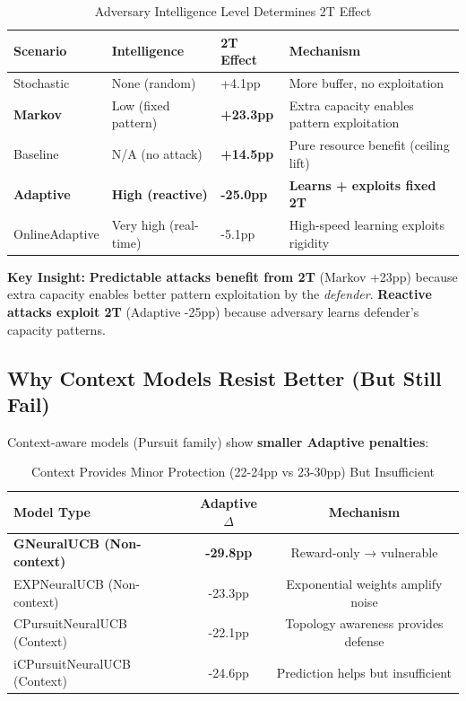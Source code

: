 \documentclass[11pt,a4paper]{article}
\newcommand{\critical}[1]{\textcolor{criticalcolor}{\textbf{#1}}}
\newcommand{\success}[1]{\textcolor{successcolor}{\textbf{#1}}}
\begin{document}
\vspace{-0.4cm}
\begin{table}[h]
\scriptsize
\centering
\begin{tabular}{llll}
\toprule
\textbf{Scenario} & \textbf{Intelligence} & \textbf{2T Effect} & \textbf{Mechanism} \\
\midrule
Stochastic & None (random) & +4.1pp & More buffer, no exploitation \\
\success{Markov} & Low (fixed pattern) & \success{+23.3pp} & Extra capacity enables pattern exploitation \\
Baseline & N/A (no attack) & \success{+14.5pp} & Pure resource benefit (ceiling lift) \\
\critical{Adaptive} & \critical{High (reactive)} & \critical{-25.0pp} & \critical{Learns + exploits fixed 2T} \\
OnlineAdaptive & Very high (real-time) & -5.1pp & High-speed learning exploits rigidity \\
\bottomrule
\end{tabular}
\vspace{-0.2cm}
\caption{Adversary Intelligence Level Determines 2T Effect}
\end{table}

\vspace{-0.2cm}
\textbf{Key Insight:} \success{Predictable attacks benefit from 2T} (Markov +23pp) because extra capacity enables better pattern exploitation by the \textit{defender}. \critical{Reactive attacks exploit 2T} (Adaptive -25pp) because adversary learns defender's capacity patterns.

\subsection{Why Context Models Resist Better (But Still Fail)}

Context-aware models (Pursuit family) show \textbf{smaller Adaptive penalties}:

\vspace{-0.4cm}
\begin{table}[h]
\scriptsize
\centering
\begin{tabular}{lcc}
\toprule
\textbf{Model Type} & \textbf{Adaptive $\Delta$} & \textbf{Mechanism} \\
\midrule
\critical{GNeuralUCB (Non-context)} & \critical{-29.8pp} & Reward-only → vulnerable \\
EXPNeuralUCB (Non-context) & -23.3pp & Exponential weights amplify noise \\
CPursuitNeuralUCB (Context) & -22.1pp & Topology awareness provides defense \\
iCPursuitNeuralUCB (Context) & -24.6pp & Prediction helps but insufficient \\
\bottomrule
\end{tabular}
\vspace{-0.2cm}
\caption{Context Provides Minor Protection (22-24pp vs 23-30pp) But Insufficient}
\end{table}
\end{document}
